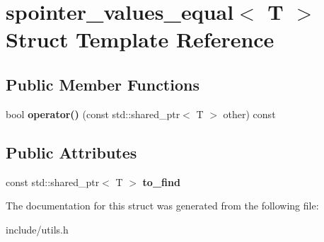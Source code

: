 \hypertarget{structspointer__values__equal}{}\section{spointer\+\_\+values\+\_\+equal$<$ T $>$ Struct Template Reference}
\label{structspointer__values__equal}
\subsection*{Public Member Functions}
\begin{DoxyCompactItemize}
\item 
\mbox{\label{structspointer__values__equal_a60d5052ca3584627868cb4114dd8fb4b}} 
bool {\bfseries operator()} (const std\+::shared\+\_\+ptr$<$ T $>$ other) const
\end{DoxyCompactItemize}
\subsection*{Public Attributes}
\begin{DoxyCompactItemize}
\item 
\mbox{\label{structspointer__values__equal_acbf739f5bf9651671603b3cc6b467136}} 
const std\+::shared\+\_\+ptr$<$ T $>$ {\bfseries to\+\_\+find}
\end{DoxyCompactItemize}


The documentation for this struct was generated from the following file\+:\begin{DoxyCompactItemize}
\item 
include/utils.\+h\end{DoxyCompactItemize}
